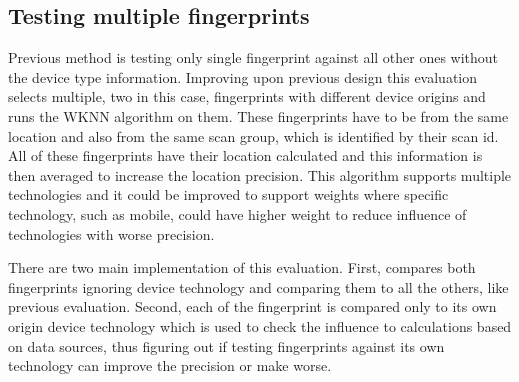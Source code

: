 \subsection{Testing multiple fingerprints}\label{sec:TestingMultipleFingerprint}
Previous method is testing only single fingerprint against all other ones without the device type information. Improving upon previous design this evaluation selects multiple, two in this case, fingerprints with different device origins and runs the WKNN algorithm on them. These fingerprints have to be from the same location and also from the same scan group, which is identified by their scan id. All of these fingerprints have their location calculated and this information is then averaged to increase the location precision. This algorithm supports multiple technologies and it could be improved to support weights where specific technology, such as mobile, could have higher weight to reduce influence of technologies with worse precision.

There are two main implementation of this evaluation. First, compares both fingerprints ignoring device technology and comparing them to all the others, like previous evaluation. Second, each of the fingerprint is compared only to its own origin device technology which is used to check the influence to calculations based on data sources, thus figuring out if testing fingerprints against its own technology can improve the precision or make worse.

\begin{table}[h]
	\begin{center}
		\caption{List of errors for testing multiple fingerprints}
		\label{tab06c06}
	\end{center}
\end{table}


